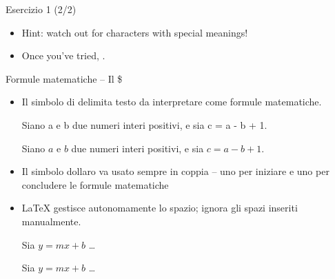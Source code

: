 \documentclass{beamer}
\begin{document}
\begin{frame}[fragile]{\centerline{Esercizio 1 (2/2)}}


\begin{center}
\end{center}

\begin{itemize}
\item Hint: watch out for characters with special meanings!
\item Once you've tried,
.
\end{itemize}
\end{frame}

\begin{frame}[fragile]{\centerline{Formule matematiche -- Il \$}}
\begin{itemize}
\item Il simbolo di \keystrokebftt{\$} delimita testo da interpretare come formule matematiche.\\[1ex]
\begin{exampletwouptiny}
Siano a e b due numeri interi
positivi, e sia c = a - b + 1.

Siano $a$ e $b$ due numeri interi
positivi, e sia $c = a - b + 1$.
\end{exampletwouptiny}
\item Il simbolo dollaro va usato sempre in coppia -- uno per iniziare e uno per concludere le formule matematiche
\item \LaTeX{} gestisce autonomamente lo spazio; ignora gli spazi inseriti manualmente.
\begin{exampletwouptiny}
Sia $y=mx+b$  \ldots

Sia $y = m x + b$  \ldots
\end{exampletwouptiny}
\end{itemize}
\end{frame}
\end{document}
